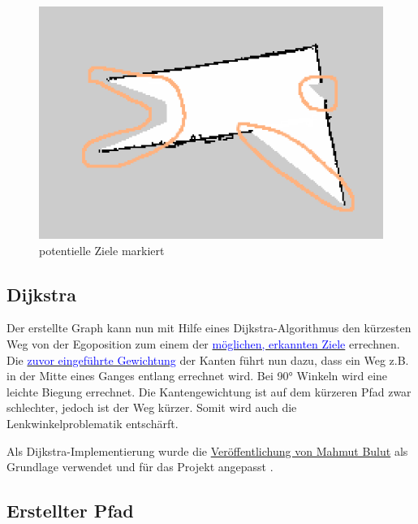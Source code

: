\begin{figure}[h]
\begin{center}
\includegraphics[width=15cm]{images/chapter5/MapUebergaenge_Markiert.png}
\caption{potentielle Ziele markiert}
\label{Map_aus_Graph}
\end{center}
\end{figure}



\subsection{Dijkstra}


Der erstellte Graph kann nun mit Hilfe eines Dijkstra-Algorithmus den kürzesten Weg von der Egoposition zum einem der 
\hyperref[sec:ziele]{\textcolor{blue}{möglichen, erkannten Ziele}} errechnen. Die \hyperref[sec:gewichtung]{\textcolor{blue}{zuvor eingeführte Gewichtung}} der Kanten führt nun dazu, dass ein Weg z.B. in der Mitte eines Ganges entlang errechnet wird. Bei 90° Winkeln wird eine leichte Biegung errechnet. Die Kantengewichtung ist auf dem kürzeren Pfad zwar schlechter, jedoch ist der Weg kürzer. Somit wird auch die Lenkwinkelproblematik entschärft. 

Als Dijkstra-Implementierung wurde die \href{https://gist.github.com/vertexclique/7410577}{Veröffentlichung von Mahmut Bulut} als Grundlage verwendet und für das Projekt angepasst \cite{dijkstra.2018}.



\subsection{Erstellter Pfad}

